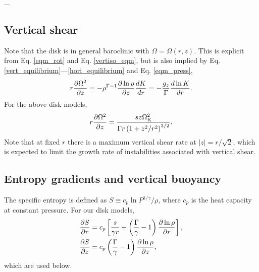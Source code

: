 ...


\subsection{Vertical shear}\label{vshear_def}
Note that the disk is in general baroclinic with $\Omega =
\Omega(r,z)$. This is explicit from Eq. \ref{eqm_rot} and Eq. \ref{vertiso_eqm}, but is also 
implied by Eq. \ref{vert_equilibrium}---\ref{hori_equilibrium} and 
Eq. \ref{eqm_press},  
\begin{align}
  r\frac{\partial\Omega^2}{\partial z} = - \rho^{\Gamma-1}\frac{\partial\ln\rho}{\partial
    z}\frac{dK}{dr} = - \frac{g_z}{\Gamma}\frac{d\ln K}{dr}.\label{vertical_shear}
\end{align}
For the above disk models,
\begin{align}
  r\frac{\partial\Omega^2}{\partial z} = \frac{sz\Omega_{\rm K}^2}{\Gamma
    r\left(1+z^2/r^2\right)^{3/2}}. \label{vertical_shear_ex} 
\end{align}
Note that at fixed $r$ there is a maximum vertical shear rate at $|z|=r/\sqrt{2}$,
which is expected to limit the growth rate of instabilities associated with vertical shear. 

\subsection{Entropy gradients and vertical buoyancy}
The specific entropy is defined as $S\equiv
c_p\ln{P^{1/\gamma}/\rho}$, where $c_p$ is the heat capacity at
constant pressure. For our disk models,
\begin{align}
  &\frac{\partial S}{\partial r} = c_p\left[\frac{s}{\gamma r} +
    \left(\frac{\Gamma}{\gamma}-1\right)\frac{\partial \ln{\rho}}{\partial
       r}\right],\\
  &\frac{\partial S}{\partial z} = c_p
  \left(\frac{\Gamma}{\gamma}-1\right)\frac{\partial \ln{\rho}}{\partial z},\label{dSdz}
\end{align} 
which are used below. 

